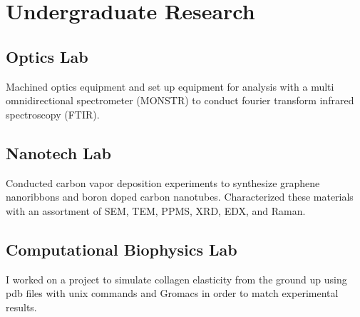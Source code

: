 \documentclass[../r.tex]{subfiles}
\begin{document}
\section{Undergraduate Research}

\subsection{Optics Lab}
Machined optics equipment and set up equipment for analysis with a multi omnidirectional spectrometer (MONSTR) to conduct fourier transform infrared spectroscopy (FTIR).

\subsection{Nanotech Lab}
Conducted carbon vapor deposition experiments to synthesize graphene nanoribbons and boron doped carbon nanotubes.  Characterized these materials with an assortment of SEM, TEM, PPMS, XRD, EDX, and Raman. 

\subsection{Computational Biophysics Lab}
I worked on a project to simulate collagen elasticity from the ground up using pdb files with unix commands and Gromacs in order to match experimental results.
\end{document}
